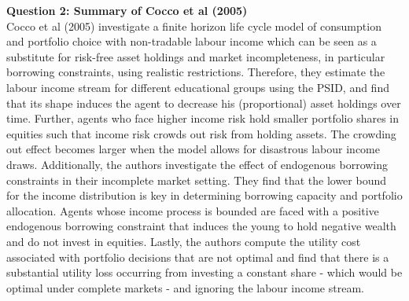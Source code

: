 \documentclass[a4paper,12pt, parskip=half-]{scrartcl}
\begin{document}
\textbf{Question 2: Summary of Cocco et al (2005)}\\

Cocco et al (2005) investigate a finite horizon life cycle model of consumption and portfolio choice with non-tradable labour income which can be seen as a substitute for risk-free asset holdings and market incompleteness, in particular borrowing constraints, using realistic restrictions. Therefore, they estimate the labour income stream for different educational groups using the PSID, and find that its shape induces the agent to decrease his (proportional) asset holdings over time. Further, agents who face higher income risk hold smaller portfolio shares in equities such that income risk crowds out risk from holding assets. The crowding out effect becomes larger when the model allows for disastrous labour income draws. Additionally, the authors investigate the effect of endogenous borrowing constraints in their incomplete market setting. They find that the lower bound for the income distribution is key in determining borrowing capacity and portfolio allocation. Agents whose income process is bounded are faced with a positive endogenous borrowing constraint that induces the young to hold negative wealth and do not invest in equities. Lastly, the authors compute the utility cost associated with portfolio decisions that are not optimal and find that there is a substantial utility loss occurring from investing a constant share - which would be optimal under complete markets - and ignoring the labour income stream.
\end{document}
